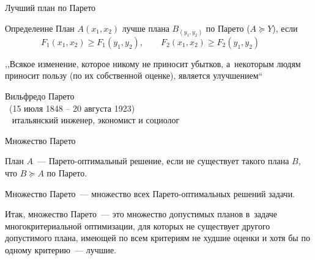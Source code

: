 \documentclass[unicode,11pt,notheorems,xcolor=table]{beamer}
\begin{document}
\begin{frame}{Лучший план по Парето}
    \begin{block}{Определеине}
        \alert{План $A(x_1,x_2)$ лучше плана $B_(y_1,y_2)$ по Парето} ($A \succcurlyeq Y$), если 
        $$
         F_1(x_1,x_2) \geqslant F_1(y_1,y_2), \qquad F_2(x_1,x_2) \geqslant F_2(y_1,y_2) \qquad 
         $$
    \end{block}

    \bigskip
    ,,Всякое изменение, которое никому не приносит убытков, а~некоторым людям приносит пользу (по их собственной оценке), является улучшением``
    
    {\raggedleft \small Вильфредо Парето\\ (15 июля 1848 -- 20 августа 1923)\\ 
    итальянский  инженер, экономист и социолог\par}
\end{frame}

\begin{frame}{Множество Парето}

    План $A$~--- \alert{Парето-оптимальный решение}, если не существует такого плана $B$, что $B \succcurlyeq A$ по Парето.
    
    \bigskip
    \begin{block}{}
        \alert{Множество Парето}~--- множество  всех Парето-оптимальных решений задачи.
    \end{block}
    \bigskip

  
    Итак, \alert{множество Парето}~--- это множество допустимых планов  в~задаче многокритериальной оптимизации, для которых не существует другого допустимого плана, имеющей по всем критериям не худшие оценки и хотя бы по одному критерию~--- лучшие.
        

    
\end{frame}


\end{document}
